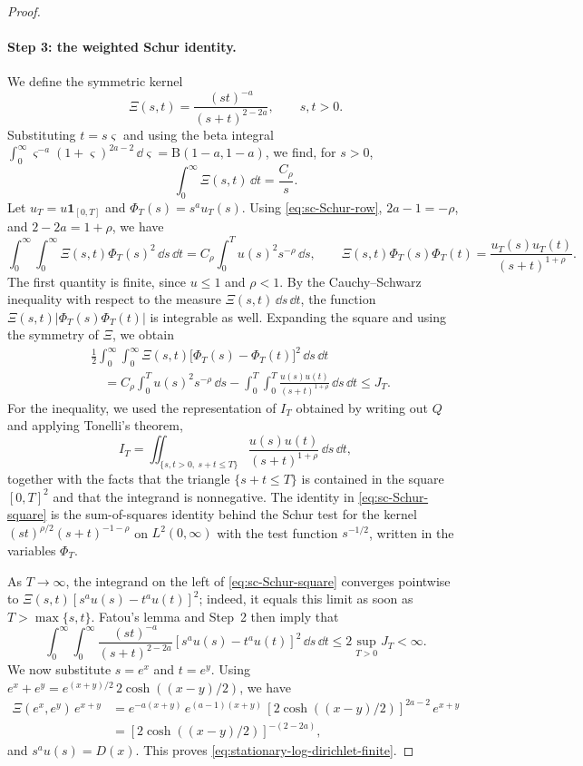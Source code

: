 \begin{proof}
\paragraph{Step 3: the weighted Schur identity.} We define the symmetric kernel
\[
 \Xi(s,t)=\frac{(st)^{-a}}{(s+t)^{2-2a}},\qquad s,t>0 .
\]
Substituting $t=s\varsigma$ and using the beta integral $\int_0^\infty\varsigma^{-a}(1+\varsigma)^{2a-2}\,\dd\varsigma=\mathrm B(1-a,1-a)$, we find, for $s>0$,
\begin{equation}\label{eq:sc-Schur-row}
 \int_0^\infty\Xi(s,t)\,\dd t=\frac{C_\rho}s .
\end{equation}
Let $u_T=u\mathbf 1_{[0,T]}$ and $\Phi_T(s)=s^au_T(s)$. Using \eqref{eq:sc-Schur-row}, $2a-1=-\rho$, and $2-2a=1+\rho$, we have
\[
 \int_0^\infty\!\!\int_0^\infty\Xi(s,t)\Phi_T(s)^2\,\dd s\,\dd t=C_\rho\int_0^Tu(s)^2s^{-\rho}\,\dd s,
 \qquad
 \Xi(s,t)\Phi_T(s)\Phi_T(t)=\frac{u_T(s)u_T(t)}{(s+t)^{1+\rho}} .
\]
The first quantity is finite, since $u\le1$ and $\rho<1$. By the Cauchy--Schwarz inequality with respect to the measure $\Xi(s,t)\,\dd s\,\dd t$, the function $\Xi(s,t)|\Phi_T(s)\Phi_T(t)|$ is integrable as well. Expanding the square and using the symmetry of $\Xi$, we obtain
\begin{align}
 &\frac12\int_0^\infty\!\!\int_0^\infty
 \Xi(s,t)\bigl[\Phi_T(s)-\Phi_T(t)\bigr]^2\,\dd s\,\dd t\nonumber\\
 &\quad=C_\rho\int_0^T u(s)^2s^{-\rho}\,\dd s
     -\int_0^T\!\!\int_0^T\frac{u(s)u(t)}{(s+t)^{1+\rho}}
                         \,\dd s\,\dd t
 \le J_T.
 \label{eq:sc-Schur-square}
\end{align}
For the inequality, we used the representation of $I_T$ obtained by writing out $Q$ and applying Tonelli's theorem,
\[
 I_T=\iint_{\{s,t>0,\ s+t\le T\}}\frac{u(s)u(t)}{(s+t)^{1+\rho}}\,\dd s\,\dd t,
\]
together with the facts that the triangle $\{s+t\le T\}$ is contained in the square $[0,T]^2$ and that the integrand is nonnegative. The identity in \eqref{eq:sc-Schur-square} is the sum-of-squares identity behind the Schur test \cite[Section~7, Equation~(1), pp.~23--24]{schur1911} for the kernel $(st)^{\rho/2}(s+t)^{-1-\rho}$ on $L^2(0,\infty)$ with the test function $s^{-1/2}$, written in the variables $\Phi_T$.

As $T\to\infty$, the integrand on the left of \eqref{eq:sc-Schur-square} converges pointwise to $\Xi(s,t)[s^au(s)-t^au(t)]^2$; indeed, it equals this limit as soon as $T>\max\{s,t\}$. Fatou's lemma and Step~2 then imply that
\[
 \int_0^\infty\!\!\int_0^\infty
 \frac{(st)^{-a}}{(s+t)^{2-2a}}
 [s^au(s)-t^au(t)]^2\,\dd s\,\dd t\le2\sup_{T>0}J_T<\infty.
\]
We now substitute $s=e^x$ and $t=e^y$. Using $e^x+e^y=e^{(x+y)/2}\,2\cosh((x-y)/2)$, we have
\begin{align*}
 \Xi(e^x,e^y)\,e^{x+y}&=e^{-a(x+y)}\,e^{(a-1)(x+y)}\,[2\cosh((x-y)/2)]^{2a-2}\,e^{x+y}\\
 &=[2\cosh((x-y)/2)]^{-(2-2a)},
\end{align*}
and $s^au(s)=D(x)$. This proves \eqref{eq:stationary-log-dirichlet-finite}.


\end{proof}
